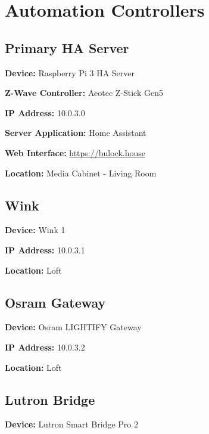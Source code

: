 \documentclass[]{article}
\begin{document}

\newpage

\vspace{\baselineskip}\section*{Automation Controllers}

\subsection{\texorpdfstring{{Primary HA Server}}{Primary HA Server}}

\textbf{Device: }
{Raspberry Pi 3 HA Server}

\textbf{Z-Wave Controller: }
{Aeotec Z-Stick Gen5}

\textbf{IP Address: }
{10.0.3.0}

\textbf{Server Application: }
{Home Assistant}

\textbf{Web Interface: }
{\href{https://www.google.com/url?q=https://bulock.house\&sa=D\&ust=1544293200077000}{https://bulock.house}}

\textbf{Location: }
{Media Cabinet - Living Room}

\subsection{\texorpdfstring{{Wink}}{Wink}}

\textbf{Device: }
{Wink 1}

\textbf{IP Address: }
{10.0.3.1}

\textbf{Location: }{Loft}

\subsection{\texorpdfstring{{Osram Gateway}}{Osram Gateway}}

\textbf{Device: }
{Osram LIGHTIFY Gateway}

\textbf{IP Address: }
{10.0.3.2}

\textbf{Location: }
{Loft}

\subsection{\texorpdfstring{{Lutron Bridge}}{Lutron Bridge}}

\textbf{Device: }
{Lutron Smart Bridge Pro 2}
\end{document}
